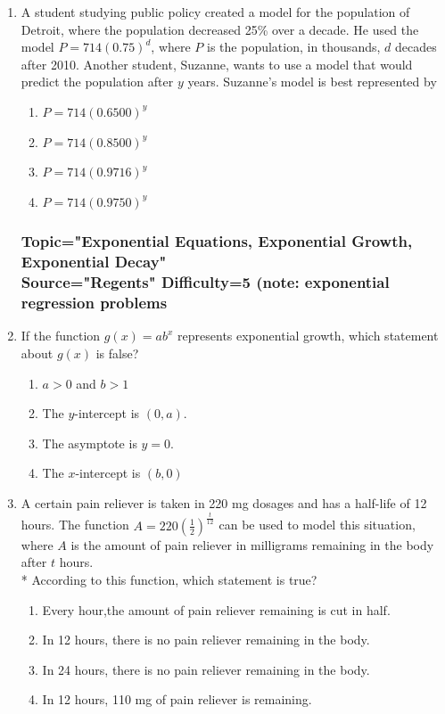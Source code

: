 \documentclass[12pt, oneside]{article}
\begin{document}
\begin{enumerate}
\item A student studying public policy created a model for the population of Detroit, where the population decreased 25\% over a decade. He used the model $P =714(0.75)^d$, where $P$ is the population, in thousands, $d$ decades after 2010. Another student, Suzanne, wants to use a model that would predict the population after $y$ years. Suzanne’s model is best represented by
\begin{enumerate}
    \item $P=714(0.6500)^y$
    \item $P=714(0.8500)^y$
    \item $P=714(0.9716)^y$
    \item $P=714(0.9750)^y$
\end{enumerate}  %


\subsubsection*{Topic="Exponential Equations, Exponential Growth, Exponential Decay"\\
Source="Regents" 
Difficulty=5 (note: exponential regression problems}

\item If the function $g(x) = ab^x$ represents exponential growth, which statement about $g(x)$ is false?
\begin{enumerate}
    \item $a > 0$ and $b>1$
    \item The $y$-intercept is $(0, a)$.
    \item The asymptote is $y=0$.
    \item The $x$-intercept is $(b,0)$
\end{enumerate} %

\item A certain pain reliever is taken in 220 mg dosages and has a half-life of 12 hours. The function $\displaystyle A = 220 \left( \frac{1}{2} \right) ^\frac{t}{12}$ can be used to model this situation, where $A$ is the amount of pain reliever in milligrams remaining in the body after $t$ hours.\\*
According to this function, which statement is true?
\begin{enumerate}
    \item Every hour,the amount of pain reliever remaining is cut in half. 
    \item In 12 hours, there is no pain reliever remaining in the body.
    \item In 24 hours, there is no pain reliever remaining in the body.
    \item In 12 hours, 110 mg of pain reliever is remaining.
\end{enumerate}


\end{enumerate}
\end{document}
